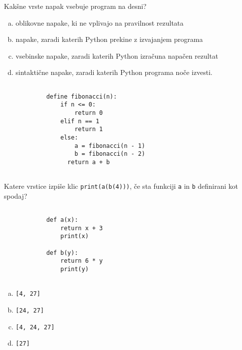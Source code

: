 \documentclass[arhiv, 10pt]{../izpit}
\newcommand{\inlinepy}[1]{\texttt{#1}}
\begin{document}
        \naloga*
        \begin{multicols}{2}
        \noindent
        Kakšne vrste napak vsebuje program na desni?

        \begin{enumerate}[(a)]
\item oblikovne napake, ki ne vplivajo na pravilnost rezultata
\item napake, zaradi katerih Python prekine z izvajanjem programa
\item vsebinske napake, zaradi katerih Python izračuna napačen rezultat
\item sintaktične napake, zaradi katerih Python programa noče izvesti.
\end{enumerate}

        \columnbreak

        \begin{verbatim}
        
            define fibonacci(n):
                if n <= 0:
                    return 0
                elif n == 1
                    return 1
                else:
                    a = fibonacci(n - 1)
                    b = fibonacci(n - 2)
                  return a + b
            
        \end{verbatim}

        \end{multicols}

    
        \naloga*
        Katere vrstice izpiše klic \inlinepy{print(a(b(4)))}, če sta funkciji \inlinepy{a} in \inlinepy{b} definirani kot spodaj?

        \begin{multicols}{2}
        \begin{verbatim}
        
            def a(x):
                return x + 3
                print(x)

            def b(y):
                return 6 * y
                print(y)
        
        \end{verbatim}

        \begin{enumerate}[(a)]
\item \inlinepy{[4, 27]}
\item \inlinepy{[24, 27]}
\item \inlinepy{[4, 24, 27]}
\item \inlinepy{[27]}
\end{enumerate}

        \end{multicols}
    
\end{document}
